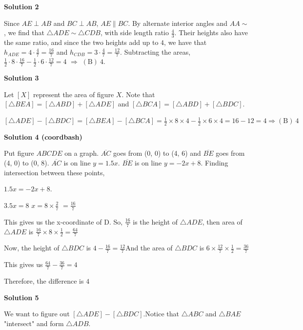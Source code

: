 \begin{enumerate}
\textbf{Solution 2}

Since $AE \perp AB$ and $BC \perp AB$, $AE \parallel BC$. By alternate interior angles and $AA\sim$, we find that $\triangle ADE \sim \triangle CDB$, with side length ratio $\frac{4}{3}$. Their heights also have the same ratio, and since the two heights add up to $4$, we have that $h_{ADE} = 4 \cdot \frac{4}{7} = \frac{16}{7}$ and $h_{CDB} = 3 \cdot \frac 47 = \frac {12}7$. Subtracting the areas, $\frac{1}{2} \cdot 8 \cdot \frac {16}7 - \frac 12 \cdot 6 \cdot \frac{12}7 = 4$ $\Rightarrow$ $\boxed{\mathrm{(B)}\ 4}$.

 



\textbf{Solution 3}

Let $[X]$ represent the area of figure $X$. Note that $[\triangle BEA]=[\triangle ABD]+[\triangle ADE]$ and $[\triangle BCA]=[\triangle ABD]+[\triangle BDC]$.

 $[\triangle ADE]-[\triangle BDC]=[\triangle BEA]-[\triangle BCA]=\frac{1}{2}\times8\times4-\frac{1}{2}\times6\times4= 16-12=4\Rightarrow\boxed{\mathrm{(B)}\ 4}$




\textbf{Solution 4 (coordbash)}

Put figure $ABCDE$ on a graph. $\overline{AC}$ goes from (0, 0) to (4, 6) and $\overline{BE}$ goes from (4, 0) to (0, 8). $\overline{AC}$ is on line $y = 1.5x$. $\overline{BE}$ is on line $y = -2x + 8$. Finding intersection between these points,

 $1.5x = -2x + 8$. 

 $3.5x = 8$
$x = 8 \times \frac{2}{7}$
$= \frac{16}{7}$

 This gives us the x-coordinate of D. So, $\frac{16}{7}$ is the height of $\triangle ADE$, then area of $\triangle ADE$ is $\frac{16}{7} \times 8 \times \frac{1}{2}$$= \frac{64}{7}$

 Now, the height of $\triangle BDC$ is $4-\frac{16}{7} = \frac{12}{7}$And the area of $\triangle BDC$ is $6 \times \frac{12}{7} \times \frac{1}{2} = \frac{36}{7}$

 This gives us $\frac{64}{7} - \frac{36}{7} = 4$

 Therefore, the difference is $4$




\textbf{Solution 5}

We want to figure out $[\triangle ADE] - [\triangle BDC]$.Notice that $\triangle ABC$ and $\triangle BAE$ "intersect" and form $\triangle ADB$.


\end{enumerate}
